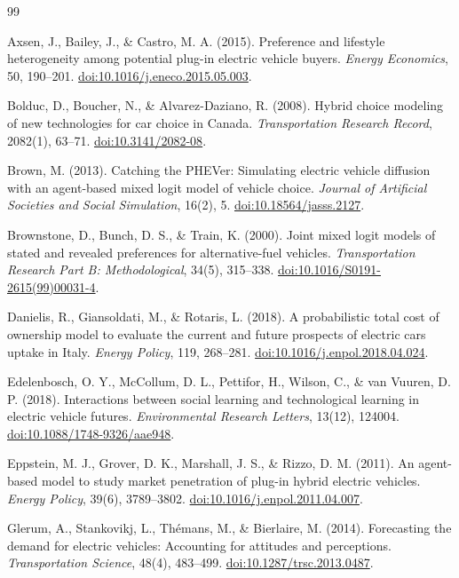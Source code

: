 \documentclass[11pt]{article}
\begin{document}
\begin{thebibliography}{99}

Axsen, J., Bailey, J., \& Castro, M. A. (2015).
Preference and lifestyle heterogeneity among potential plug-in electric vehicle
buyers.
\emph{Energy Economics}, 50, 190--201.
\href{https://doi.org/10.1016/j.eneco.2015.05.003}{doi:10.1016/j.eneco.2015.05.003}.

Bolduc, D., Boucher, N., \& Alvarez-Daziano, R. (2008).
Hybrid choice modeling of new technologies for car choice in Canada.
\emph{Transportation Research Record}, 2082(1), 63--71.
\href{https://doi.org/10.3141/2082-08}{doi:10.3141/2082-08}.

Brown, M. (2013).
Catching the PHEVer: Simulating electric vehicle diffusion with an
agent-based mixed logit model of vehicle choice.
\emph{Journal of Artificial Societies and Social Simulation}, 16(2), 5.
\href{https://doi.org/10.18564/jasss.2127}{doi:10.18564/jasss.2127}.

Brownstone, D., Bunch, D. S., \& Train, K. (2000).
Joint mixed logit models of stated and revealed preferences for
alternative-fuel vehicles.
\emph{Transportation Research Part B: Methodological}, 34(5), 315--338.
\href{https://doi.org/10.1016/S0191-2615(99)00031-4}{doi:10.1016/S0191-2615(99)00031-4}.

Danielis, R., Giansoldati, M., \& Rotaris, L. (2018).
A probabilistic total cost of ownership model to evaluate the current and future
prospects of electric cars uptake in Italy.
\emph{Energy Policy}, 119, 268--281.
\href{https://doi.org/10.1016/j.enpol.2018.04.024}{doi:10.1016/j.enpol.2018.04.024}.

Edelenbosch, O. Y., McCollum, D. L., Pettifor, H., Wilson, C., \& van Vuuren, D. P. (2018).
Interactions between social learning and technological learning in electric
vehicle futures.
\emph{Environmental Research Letters}, 13(12), 124004.
\href{https://doi.org/10.1088/1748-9326/aae948}{doi:10.1088/1748-9326/aae948}.

Eppstein, M. J., Grover, D. K., Marshall, J. S., \& Rizzo, D. M. (2011).
An agent-based model to study market penetration of plug-in hybrid electric
vehicles.
\emph{Energy Policy}, 39(6), 3789--3802.
\href{https://doi.org/10.1016/j.enpol.2011.04.007}{doi:10.1016/j.enpol.2011.04.007}.

Glerum, A., Stankovikj, L., Th\'{e}mans, M., \& Bierlaire, M. (2014).
Forecasting the demand for electric vehicles: Accounting for attitudes and
perceptions.
\emph{Transportation Science}, 48(4), 483--499.
\href{https://doi.org/10.1287/trsc.2013.0487}{doi:10.1287/trsc.2013.0487}.


\end{thebibliography}
\end{document}

